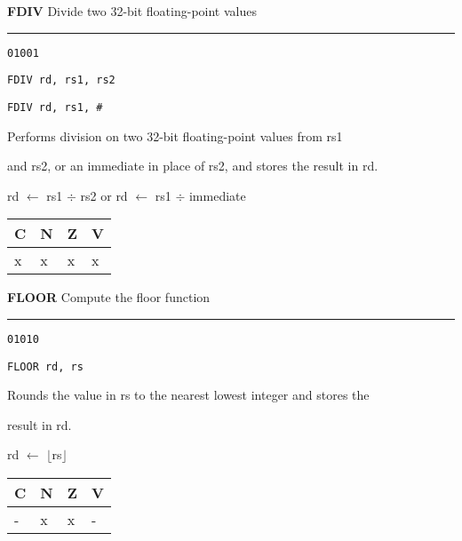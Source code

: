 \documentclass{article}
\begin{document}
\bigskip\bigskip

\flushleft
\LARGE\textbf{FDIV} \large \hfill Divide two 32-bit floating-point values

\kern-3pt
\noindent\rule{16.5cm}{0.4pt}
\normalsize

{\large
	 \texttt{01001} \par
	\smallbreak
	 \texttt{FDIV rd, rs1, rs2} \par
	\smallbreak
	 \texttt{FDIV rd, rs1, \#<18-bit immediate>} \par
	\smallbreak
	 Performs division on two 32-bit floating-point values from rs1 \par
	\makebox[3.5cm][l]{  } and rs2, or an immediate in place of rs2, and stores the result in rd. \par
	\smallbreak
	 rd $\leftarrow$ rs1 $\div$ rs2 \quad or \quad rd $\leftarrow$ rs1 $\div$ immediate\par
	\smallbreak
	 \begin{tabular}{llll} C \quad & N \quad & Z \quad & V \\ \hline x & x & x & x \\ \end{tabular}
}

\bigskip\bigskip

\flushleft
\LARGE\textbf{FLOOR} \large \hfill Compute the floor function

\kern-3pt
\noindent\rule{16.5cm}{0.4pt}
\normalsize

{\large
	 \texttt{01010} \par
	\smallbreak
	 \texttt{FLOOR rd, rs} \par
	\smallbreak
	 Rounds the value in rs to the nearest lowest integer and stores the \par
	\makebox[3.5cm][l]{  } result in rd. \par
	\smallbreak
	 rd $\leftarrow$ $\lfloor$rs$\rfloor$ \par
	\smallbreak
	 \begin{tabular}{llll} C \quad & N \quad & Z \quad & V \\ \hline - & x & x & - \\ \end{tabular}
}
\end{document}
